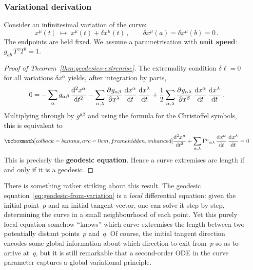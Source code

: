 

\subsubsection{Variational derivation}\label{sec:variational-derivation}

Consider an infinitesimal variation of the curve:
\[
  x^\mu(t) \;\longmapsto\; x^\mu(t) + \delta x^\mu(t)\,,
  \qquad \delta x^\mu(a) = \delta x^\mu(b) = 0\,.
\]
The endpoints are held fixed.  We assume a parametrisation with
\textbf{unit speed}: $g_{ab}\,T^a T^b = 1$.

\begin{proof}[Proof of Theorem~\ref{thm:geodesics-extremise}]
  The extremality condition $\delta\ell = 0$ for all variations
  $\delta x^\alpha$ yields, after integration by parts,
  \begin{equation}\label{eq:euler-lagrange-length}
    0 = -\sum_\alpha g_{\alpha\beta}\,
        \frac{\mathrm{d}^2 x^\alpha}{\mathrm{d} t^2}
      - \sum_{\alpha,\lambda}
        \frac{\partial^{} g_{\alpha\beta}}{\partial {x^\lambda}^{}}\,
        \frac{\mathrm{d} x^\alpha}{\mathrm{d} t}\,
        \frac{\mathrm{d} x^\lambda}{\mathrm{d} t}
      + \frac{1}{2}\sum_{\alpha,\lambda}
        \frac{\partial^{} g_{\alpha\lambda}}{\partial {x^\beta}^{}}\,
        \frac{\mathrm{d} x^\alpha}{\mathrm{d} t}\,
        \frac{\mathrm{d} x^\lambda}{\mathrm{d} t}\,.
  \end{equation}
  Multiplying through by $g^{\mu\beta}$ and using the formula
  for the Christoffel symbols, this is equivalent to
  \begin{equation}\label{eq:geodesic-from-variation}
    \eqbox{\frac{\dd^2 x^\mu}{\dd t^2}
      + \sum_{\alpha,\lambda}
        \chris{\mu}{\alpha\lambda}\,
        \frac{\dd x^\alpha}{\dd t}\,
        \frac{\dd x^\lambda}{\dd t}
      = 0}
  \end{equation}
  This is precisely the \textbf{geodesic equation}.  Hence a
  curve extremises arc length if and only if it is a geodesic.
\end{proof}

\begin{remark}
  There is something rather striking about this result.  The
  geodesic equation~\eqref{eq:geodesic-from-variation} is a
  \emph{local} differential equation: given the initial point~$p$
  and an initial tangent vector, one can solve it step by step,
  determining the curve in a small neighbourhood of each point.
  Yet this purely local equation somehow ``knows'' which curve
  extremises the length between two potentially distant
  points~$p$ and~$q$.  Of course, the initial tangent direction
  encodes some global information about which direction to exit
  from~$p$ so as to arrive at~$q$, but it is still remarkable
  that a second-order ODE in the curve parameter captures a
  global variational principle.
\end{remark}

